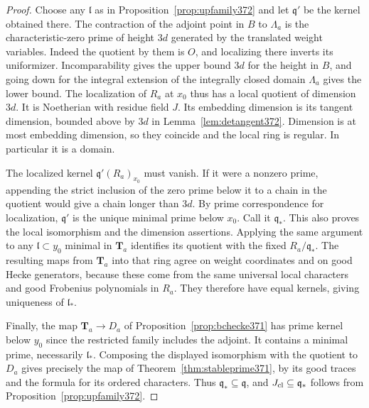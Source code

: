 \documentclass[a4paper,11pt]{article}
\theoremstyle{definition}
\theoremstyle{remark}
\numberwithin{equation}{section}
\begin{document}
\begin{proof}
Choose any \(\mathfrak l\) as in Proposition~\ref{prop:upfamily372}
and let \(\mathfrak q'\) be the kernel obtained there.
The contraction of the adjoint point in \(B\) to
\(\Lambda_a\) is the characteristic-zero prime of height
\(3d\) generated by the translated weight variables.
Indeed the quotient by them is \(O\), and localizing there
inverts its uniformizer. Incomparability gives the upper
bound \(3d\) for the height in \(B\), and going down for
the integral extension of the integrally closed domain
\(\Lambda_a\) gives the lower bound. The localization of
\(R_a\) at \(x_0\) thus has a local quotient of dimension
\(3d\). It is Noetherian with residue field \(J\). Its
embedding dimension is its tangent dimension, bounded above
by \(3d\) in Lemma~\ref{lem:detangent372}. Dimension is at
most embedding dimension, so they coincide and the local
ring is regular. In particular it is a domain.

The localized kernel \(\mathfrak q'(R_a)_{x_0}\) must vanish.
If it were a nonzero prime, appending the strict inclusion
of the zero prime below it to a chain in the quotient would
give a chain longer than \(3d\). By prime correspondence
for localization, \(\mathfrak q'\) is the unique minimal prime
below \(x_0\). Call it \(\mathfrak q_*\). This also proves
the local isomorphism and the dimension assertions. Applying
the same argument to any \(\mathfrak l\subset y_0\) minimal
in \(\mathbf T_a\) identifies its quotient with the fixed
\(R_a/\mathfrak q_*\). The resulting maps from
\(\mathbf T_a\) into that ring agree on weight coordinates
and on good Hecke generators, because these come from the
same universal local characters and good Frobenius
polynomials in \(R_a\). They therefore have equal kernels,
giving uniqueness of \(\mathfrak l_*\).

Finally, the map \(\mathbf T_a\to D_a\) of
Proposition~\ref{prop:bchecke371} has prime kernel below
\(y_0\) since the restricted family includes the adjoint.
It contains a minimal prime, necessarily \(\mathfrak l_*\).
Composing the displayed isomorphism with the quotient to
\(D_a\) gives precisely the map of
Theorem~\ref{thm:stableprime371}, by its good traces and
the formula for its ordered characters. Thus
\(\mathfrak q_*\subseteq\mathfrak q\), and
\(J_{\rm cl}\subseteq\mathfrak q_*\) follows from
Proposition~\ref{prop:upfamily372}.
\end{proof}
\end{document}
